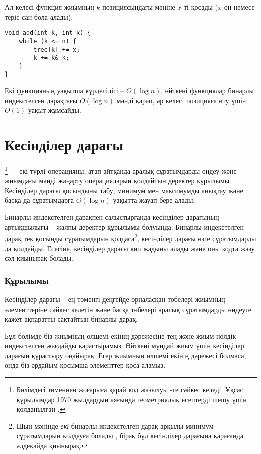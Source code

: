 Ал келесі функция жиымның $k$ позициясындағы
мәніне $x$-ті қосады ($x$ оң немесе теріс сан бола алады): 
\begin{lstlisting}
void add(int k, int x) {
    while (k <= n) {
        tree[k] += x;
        k += k&-k;
    }
}
\end{lstlisting}

Екі функцияның уақытша күрделілігі -- $O(\log n)$, 
өйткені функциялар бинарлы индекстелген 
дарақтағы $O(\log n)$ мәнді қарап, әр 
келесі позицияға өту үшін $O(1)$ уақыт жұмсайды. 

\section{Кесінділер дарағы}


\footnote{Бөлімдегі төменнен жоғарыға қарай код жазылуы \cite{sta06}-ге сәйкес келеді.  Ұқсас құрылымдар 1970 жылдардың аяғында геометриялық есептерді шешу үшін қолданылған \cite{ben80}.} ––
екі түрлі операцияны, атап айтқанда
аралық сұратымдарды өңдеу және жиымдағы мәнді жаңарту операцияларын қолдайтын деректер құрылымы. 
Кесінділер дарағы қосындыны табу, минимум мен максимумды анықтау және басқа да сұратымдарға  $O(\log n)$ уақытта жауап бере алады.

Бинарлы индекстелген дарақпен салыстырғанда кесінділер дарағының артықшылығы -- жалпы деректер құрылымы болуында. Бинарлы индекстелген 
дарақ тек қосынды сұратымдарын қолдаса\footnote{Шын мәнінде
\emph{екі} бинарлы индекстелген дарақ арқылы 
минимум сұратымдарын қолдауға болады \cite{dim15}, бірақ
бұл кесінділер дарағына қарағанда әлдеқайда қиынырақ.}, 
кесінділер дарағы өзге сұратымдарды да қолдайды. 
Есесіне, кесінділер дарағы көп жадыны алады 
және оны кодта жазу сәл қиынырақ болады. 

\subsubsection{Құрылымы}

Кесінділер дарағы -- ең төменгі деңгейде орналасқан төбелері 
жиымның элементтеріне сәйкес келетін және
басқа төбелері аралық сұратымдарды өңдеуге қажет
ақпаратты сақтайтын бинарлы дарақ. 

Бұл бөлімде біз жиымның өлшемі екінің дәрежесіне тең 
және жиым нөлдік индекстелген жағдайды қарастырамыз.
Өйткені мұндай жиым үшін кесінділер дарағын құрастыру
оңайырақ. Егер жиымның өлшемі 
екінің дәрежесі болмаса,
онда біз әрдайым қосымша элементтер қоса аламыз.

